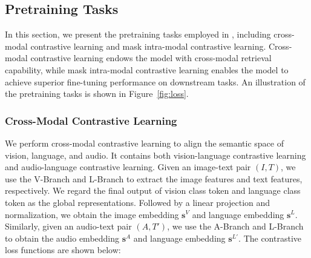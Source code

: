 \subsection{Pretraining Tasks}
In this section, we present the pretraining tasks employed in \onepeace, including cross-modal contrastive learning and mask intra-modal contrastive learning. 
Cross-modal contrastive learning endows the model with cross-modal retrieval capability, while mask intra-modal contrastive learning enables the model to achieve superior fine-tuning performance on downstream tasks. 
An illustration of the pretraining tasks is shown in Figure~\ref{fig:loss}.

\subsubsection{Cross-Modal Contrastive Learning}
We perform cross-modal contrastive learning to align the semantic space of vision, language, and audio.
It contains both vision-language contrastive learning and audio-language contrastive learning.
Given an image-text pair $\left(I, T\right)$, we use the V-Branch and L-Branch to extract the image features and text features, respectively.
We regard the final output of vision class token and language class token as the global representations.
Followed by a linear projection and normalization, we obtain the image embedding $\bm{s}^V$ and language embedding $\bm{s}^L$.
Similarly, given an audio-text pair $\left( A, T'\right)$, we use the A-Branch and L-Branch to obtain the audio embedding $\bm{s}^A$ and language embedding $\bm{s}^{L'}$.
The contrastive loss functions are shown below:

